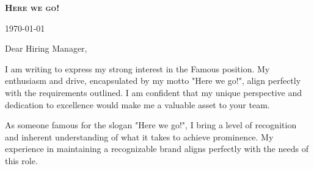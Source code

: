 \documentclass[letterpaper,11pt]{article}
\begin{document}
\begin{center}
\textbf{\Huge \scshape Here we go!}
\end{center}

\today
\vspace{20pt}

\vspace{20pt}

Dear Hiring Manager,
\vspace{10pt}

I am writing to express my strong interest in the Famous position. My enthusiasm and drive, encapsulated by my motto "Here we go!", align perfectly with the requirements outlined. I am confident that my unique perspective and dedication to excellence would make me a valuable asset to your team.
\vspace{10pt}

As someone famous for the slogan "Here we go!", I bring a level of recognition and inherent understanding of what it takes to achieve prominence. My experience in maintaining a recognizable brand aligns perfectly with the needs of this role.
\vspace{10pt}
\end{document}
